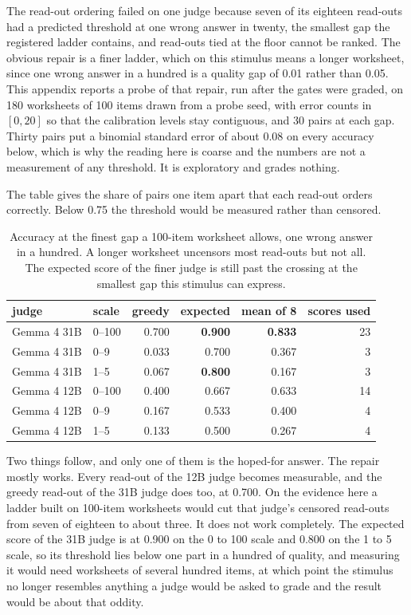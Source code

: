 \documentclass{article}
\theoremstyle{definition}
\theoremstyle{remark}
\begin{document}
The read-out ordering failed on one judge because seven of its eighteen read-outs had a predicted
threshold at one wrong answer in twenty, the smallest gap the registered ladder contains, and
read-outs tied at the floor cannot be ranked. The obvious repair is a finer ladder, which on this
stimulus means a longer worksheet, since one wrong answer in a hundred is a quality gap of 0.01 rather
than 0.05. This appendix reports a probe of that repair, run after the gates were graded, on 180
worksheets of 100 items drawn from a probe seed, with error counts in $[0,20]$ so that the
calibration levels stay contiguous, and 30 pairs at each gap. Thirty pairs put a binomial standard
error of about 0.08 on every accuracy below, which is why the reading here is coarse and the numbers
are not a measurement of any threshold. It is exploratory and grades nothing.

The table gives the share of pairs one item apart that each read-out orders correctly. Below 0.75
the threshold would be measured rather than censored.

\begin{table}[h]
\centering
\small
\caption{Accuracy at the finest gap a 100-item worksheet allows, one wrong answer in a hundred.
A longer worksheet uncensors most read-outs but not all. The expected score of the finer judge is
still past the crossing at the smallest gap this stimulus can express.}
\label{tab:longsheet}
\begin{tabular}{llrrrr}
\toprule
judge & scale & greedy & expected & mean of 8 & scores used \\
\midrule
Gemma 4 31B & 0--100 & 0.700 & \textbf{0.900} & \textbf{0.833} & 23 \\
Gemma 4 31B & 0--9    & 0.033 & 0.700 & 0.367 & 3 \\
Gemma 4 31B & 1--5    & 0.067 & \textbf{0.800} & 0.167 & 3 \\
Gemma 4 12B & 0--100 & 0.400 & 0.667 & 0.633 & 14 \\
Gemma 4 12B & 0--9    & 0.167 & 0.533 & 0.400 & 4 \\
Gemma 4 12B & 1--5    & 0.133 & 0.500 & 0.267 & 4 \\
\bottomrule
\end{tabular}
\end{table}

Two things follow, and only one of them is the hoped-for answer.
The repair mostly works. Every read-out of the 12B judge becomes measurable, and the greedy
read-out of the 31B judge does too, at 0.700. On the evidence here a ladder built on 100-item
worksheets would cut that judge's censored read-outs from seven of eighteen to about three.
It does not work completely. The expected score of the 31B judge is at 0.900 on the 0 to 100 scale
and 0.800 on the 1 to 5 scale, so its threshold lies below one part in a hundred of quality, and
measuring it would need worksheets of several hundred items, at which point the stimulus no longer
resembles anything a judge would be asked to grade and the result would be about that oddity.
\end{document}
